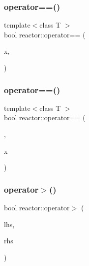 \mbox{\label{namespacereactor_ab3fb80a815368302fcd1985b0fee5a6c}} 
\subsubsection{\texorpdfstring{operator==()}{operator==()}\hspace{0.1cm}{\footnotesize\ttfamily [10/11]}}
{\footnotesize\ttfamily template$<$class T $>$ \\
bool reactor\+::operator== (\begin{DoxyParamCaption}\item[{const \hyperlink{classreactor_1_1ImmutableValuePtr}{Immutable\+Value\+Ptr}$<$ T $>$ \&}]{x,  }\item[{std\+::nullptr\+\_\+t}]{ }\end{DoxyParamCaption})}

\mbox{\label{namespacereactor_a59010e2c0f2dd0420fb59abab0a20e10}} 
\subsubsection{\texorpdfstring{operator==()}{operator==()}\hspace{0.1cm}{\footnotesize\ttfamily [11/11]}}
{\footnotesize\ttfamily template$<$class T $>$ \\
bool reactor\+::operator== (\begin{DoxyParamCaption}\item[{std\+::nullptr\+\_\+t}]{,  }\item[{const \hyperlink{classreactor_1_1ImmutableValuePtr}{Immutable\+Value\+Ptr}$<$ T $>$ \&}]{x }\end{DoxyParamCaption})}

\mbox{\label{namespacereactor_a2e90ae0e79dfde9f7fbeb54d66a1e3a8}} 
\subsubsection{\texorpdfstring{operator$>$()}{operator>()}\hspace{0.1cm}{\footnotesize\ttfamily [1/3]}}
{\footnotesize\ttfamily bool reactor\+::operator$>$ (\begin{DoxyParamCaption}\item[{const \hyperlink{classreactor_1_1Tag}{Tag} \&}]{lhs,  }\item[{const \hyperlink{classreactor_1_1Tag}{Tag} \&}]{rhs }\end{DoxyParamCaption})\hspace{0.3cm}{\ttfamily [inline]}}

